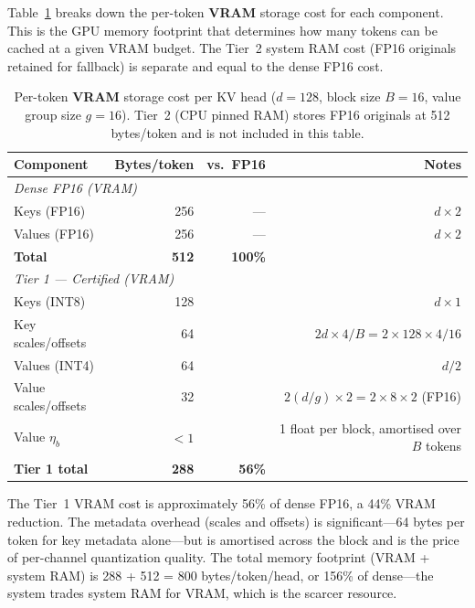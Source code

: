 \documentclass[10pt,twocolumn,a4paper]{article}
\theoremstyle{definition}
\theoremstyle{remark}
\begin{document}
Table~\ref{tab:storage} breaks down the per-token \textbf{VRAM} storage cost for each component.  This is the GPU memory footprint that determines how many tokens can be cached at a given VRAM budget.  The Tier~2 system RAM cost (FP16 originals retained for fallback) is separate and equal to the dense FP16 cost.

\begin{table}[!t]
\centering
\caption{Per-token \textbf{VRAM} storage cost per KV head ($d{=}128$, block size $B{=}16$, value group size $g{=}16$).  Tier~2 (CPU pinned RAM) stores FP16 originals at 512 bytes/token and is not included in this table.}
\label{tab:storage}
\small
\begin{tabular}{lrrr}
\toprule
\textbf{Component} & \textbf{Bytes/token} & \textbf{vs.\ FP16} & \textbf{Notes} \\
\midrule
\multicolumn{4}{l}{\emph{Dense FP16 (VRAM)}} \\
Keys (FP16)   & 256 & --- & $d \times 2$ \\
Values (FP16) & 256 & --- & $d \times 2$ \\
\textbf{Total} & \textbf{512} & \textbf{100\%} & \\
\midrule
\multicolumn{4}{l}{\emph{Tier 1 --- Certified (VRAM)}} \\
Keys (INT8)        & 128 & & $d \times 1$ \\
Key scales/offsets & 64  & & $2d \times 4 / B = 2 \times 128 \times 4 / 16$ \\
Values (INT4)      & 64  & & $d / 2$ \\
Value scales/offsets & 32  & & $2(d/g) \times 2 = 2 \times 8 \times 2$ (FP16) \\
Value $\eta_b$     & $<1$ & & 1 float per block, amortised over $B$ tokens \\
\textbf{Tier 1 total} & \textbf{288} & \textbf{56\%} & \\
\bottomrule
\end{tabular}
\end{table}

The Tier~1 VRAM cost is approximately 56\% of dense FP16, a 44\% VRAM reduction.  The metadata overhead (scales and offsets) is significant---64 bytes per token for key metadata alone---but is amortised across the block and is the price of per-channel quantization quality.  The total memory footprint (VRAM + system RAM) is 288 + 512 = 800 bytes/token/head, or 156\% of dense---the system trades system RAM for VRAM, which is the scarcer resource.
\end{document}
